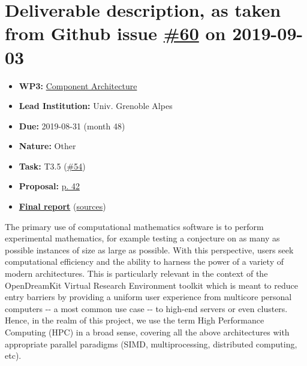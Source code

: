 \hypertarget{deliverable-description-as-taken-from-github-issue-60-on-2019-09-03}{%
\section*{\texorpdfstring{Deliverable description, as taken from Github
issue
\href{https://github.com/OpenDreamKit/OpenDreamKit/issues/60}{\#60} on
2019-09-03}{Deliverable description, as taken from Github issue \#60 on 2019-09-03}}\label{deliverable-description-as-taken-from-github-issue-60-on-2019-09-03}}

\begin{itemize}
\tightlist
\item
  \textbf{WP3:}
  \href{https://github.com/OpenDreamKit/OpenDreamKit/tree/master/WP3}{Component
  Architecture}
\item
  \textbf{Lead Institution:} Univ. Grenoble Alpes
\item
  \textbf{Due:} 2019-08-31 (month 48)
\item
  \textbf{Nature:} Other
\item
  \textbf{Task:} T3.5
  (\href{https://github.com/OpenDreamKit/OpenDreamKit/issues/54}{\#54})
\item
  \textbf{Proposal:}
  \href{https://github.com/OpenDreamKit/OpenDreamKit/raw/master/Proposal/proposal-www.pdf}{p.
  42}
\item
  \textbf{\href{https://github.com/OpenDreamKit/OpenDreamKit/raw/master/WP3/D3.11/report-final.pdf}{Final
  report}}
  (\href{https://github.com/OpenDreamKit/OpenDreamKit/raw/master/WP3/D3.11/}{sources})
\end{itemize}

The primary use of computational mathematics software is to perform
experimental mathematics, for example testing a conjecture on as
many as possible instances of size as large as possible. With this
perspective, users seek computational efficiency and the ability to
harness the power of a variety of modern architectures. This is
particularly relevant in the context of the OpenDreamKit Virtual
Research Environment toolkit which is meant to reduce entry barriers by
providing a uniform user experience from multicore personal computers
-\/- a most common use case -\/- to high-end servers or even clusters.
Hence, in the realm of this project, we use the term High Performance
Computing (HPC) in a broad sense, covering all the above architectures
with appropriate parallel paradigms (SIMD, multiprocessing, distributed
computing, etc).

